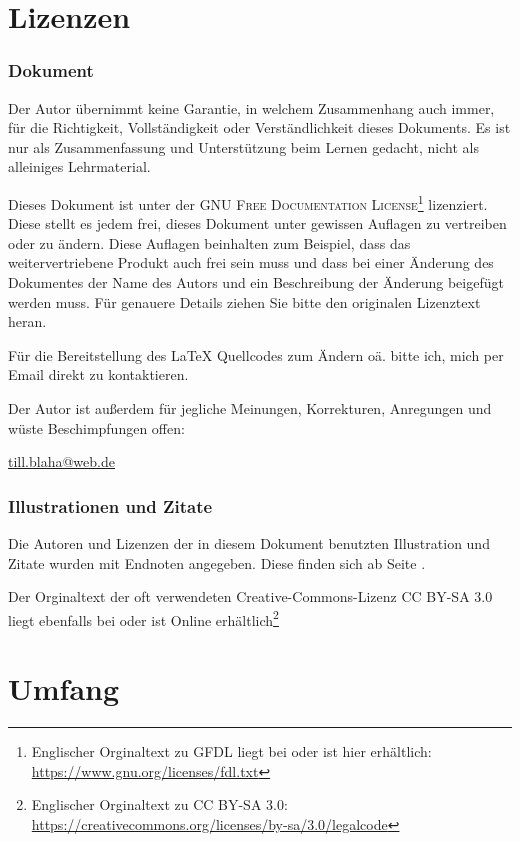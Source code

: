 \section*{Lizenzen}

\subsubsection*{Dokument}

Der Autor übernimmt keine Garantie, in welchem Zusammenhang auch immer, für die Richtigkeit, Vollständigkeit oder Verständlichkeit dieses Dokuments. Es ist nur als Zusammenfassung und Unterstützung beim Lernen gedacht, nicht als alleiniges Lehrmaterial.

Dieses Dokument ist unter der \textsc{GNU Free Documentation License}\footnote{Englischer Orginaltext zu \textsc{GFDL} liegt bei oder ist hier erhältlich: \url{https://www.gnu.org/licenses/fdl.txt}} lizenziert. Diese stellt es jedem frei, dieses Dokument unter gewissen Auflagen zu vertreiben oder zu ändern. Diese Auflagen beinhalten zum Beispiel, dass das weitervertriebene Produkt auch frei sein muss und dass bei einer Änderung des Dokumentes der Name des Autors und ein Beschreibung der Änderung beigefügt werden muss. Für genauere Details ziehen Sie bitte den originalen Lizenztext heran.

Für die Bereitstellung des \LaTeX{} Quellcodes zum Ändern oä. bitte ich, mich per Email direkt zu kontaktieren.

Der Autor ist außerdem für jegliche Meinungen, Korrekturen, Anregungen und wüste Beschimpfungen offen:

\href{mailto:till.blaha@web.de}{till.blaha@web.de}


\subsubsection*{Illustrationen und Zitate}

Die Autoren und Lizenzen der in diesem Dokument benutzten Illustration und Zitate wurden mit Endnoten angegeben. Diese finden sich ab Seite \pageref{endnotes}.

Der Orginaltext der oft verwendeten \glqq Creative-Commons\grqq -Lizenz \textsc{CC BY-SA 3.0} liegt ebenfalls bei oder ist Online erhältlich\footnote{Englischer Orginaltext zu \textsc{CC BY-SA 3.0}: \url{https://creativecommons.org/licenses/by-sa/3.0/legalcode}}


\section*{Umfang}

